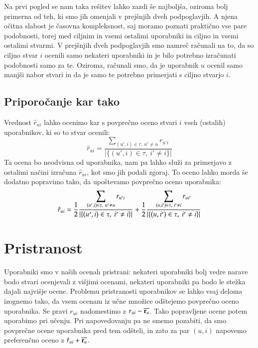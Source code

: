 Na prvi pogled se nam taka rešitev lahko zazdi še najboljša, oziroma bolj primerna od teh, ki smo jih omenjali v prejšnjih dveh podpoglavjih. A njena očitna slabost je časovna kompleksnost, saj moramo poznati praktično vse pare podobnosti, torej med ciljnim in vsemi ostalimi uporabniki in ciljno in vsemi ostalimi stvarmi. V prejšnjih dveh podpoglavjih smo namreč računali na to, da so ciljno stvar $i$ ocenili samo nekateri uporabniki in je bilo potrebno izračunati podobnosti samo za te. Oziroma, računali smo, da je uporabnik $u$ ocenil samo manjši nabor stvari in da je samo te potrebno primerjati s ciljno stvarjo $i$.

\subsection{Priporočanje kar tako}

Vrednost $\hat{r}_{ui}$ lahko ocenimo kar s povprečno oceno stvari $i$ vseh (ostalih) uporabnikov, ki so to stvar ocenili:
%
\begin{equation}
\hat{r}_{ui} = \frac{\displaystyle\sum_{(u',i)\in\tau,\ u'\neq u} r_{u'i}}{|\{(u',i)\in\tau,\ i'\neq i \}|}
\end{equation}
%
Ta ocena bo neodvisna od uporabnika, nam pa lahko služi za primerjavo z ostalimi načini izračuna $\hat{r}_{ui}$, kot smo jih podali zgoraj. To oceno lahko morda še dodatno popravimo tako, da upoštevamo povprečno oceno uporabnika:
%
\begin{equation}
\hat{r}_{ui} = {1\over 2}\frac{\displaystyle\sum_{(u',i)\in\tau,\ u'\neq u} r_{u'i}}{|\{(u',i)\in\tau,\ i'\neq i \}|} + {1\over 2}\frac{\displaystyle\sum_{(u,i')\in\tau,\ i'\neq i} r_{ui'}}{|\{(u,i')\in\tau,\ i'\neq i \}|}
\end{equation}
%

\section{Pristranost}

Uporabniki smo v naših ocenah pristrani: nekateri uporabniki bolj
vedre narave bodo stvari ocenjevali z višjimi ocenami, nekateri
uporabniki pa bodo le stežka dajali najvišje ocene. Problemu
pristranosti uporabnikov se lahko vsaj deloma izognemo tako, da vsem
ocenam iz učne množice odštejemo povprečno oceno uporabnika. Se pravi
$r_{ui}$ nadomestimo z $r_{ui}-\overline{{\bf r}_u}$. Tako
popravljene ocene potem uporabimo pri učenju. Pri napovedovanju pa ne
smemo pozabiti, da smo povprečne ocene uporabnika pred tem odšteli, in
zato za par $(u,i)$ napovemo preferenčno oceno z
$\hat{r}_{ui}+\overline{{\bf r}_u}$.

